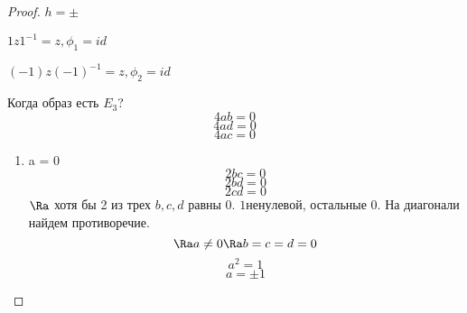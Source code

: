 \begin{proof}
$h = \pm$

$1 z 1^{-1} = z, \phi_1 = id$

$(-1)z(-1)^{-1} = z, \phi_2 = id$

Когда образ есть $E_3$?
    $$4ab = 0$$
    $$4ad = 0$$
    $$4ac = 0$$
    \begin{enumerate}
    \item a = 0
    $$2bc = 0$$
    $$2bd = 0 $$
    $$2cd =0 $$
    $\Ra $ хотя бы 2 из трех $b, c, d$ равны 0.
    $1 ненулевой$, остальные 0. На диагонали найдем противоречие.
    $$\Ra a \ne 0 \Ra b = c = d = 0$$
    $$a^2 = 1$$
    $$a = \pm 1$$
    \end{enumerate}
\end{proof}

